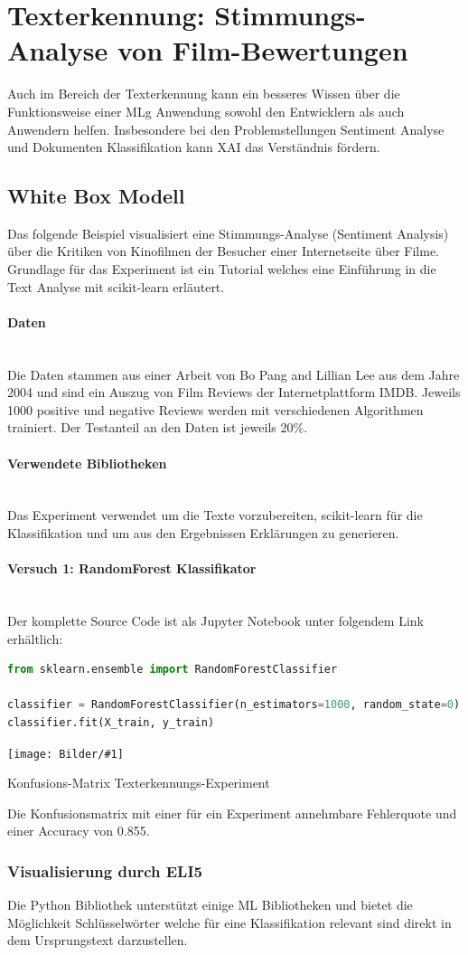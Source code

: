 \documentclass[
  12pt, %
  a4paper, %
  oneside, %
  openany, 
  numbers=noenddot, %
  BCOR=5mm, %
  parskip=half*, %
  thesis, %
]{bfhbook}
\newcommand{\parag}[1]{\paragraph*{#1}\mbox{}\\}
\newcommand{\imgText}[3]{
\begin{center}
    \begin{minipage}[t]{0.6\textwidth}
    		\vspace{0pt}
		\texttt{[image: Bilder/\#1]}
		\caption{#2}
	\end{minipage}\hfill
    \begin{minipage}[t]{0.4\textwidth}
    		\vspace{5pt}
  		#3
    \end{minipage}
\end{center}
}
\begin{document}
\section{Texterkennung: Stimmungs-Analyse von Film-Bewertungen}
Auch im Bereich der Texterkennung kann ein besseres Wissen über die Funktionsweise einer \Gls{MLg} Anwendung sowohl den Entwicklern als auch Anwendern helfen. Insbesondere bei den Problemstellungen Sentiment Analyse und Dokumenten Klassifikation kann \Gls{XAI} das Verständnis fördern.

\subsection{White Box Modell}
\label{eli5MovieReview}

Das folgende Beispiel visualisiert eine Stimmungs-Analyse (Sentiment Analysis) über die Kritiken von Kinofilmen der Besucher einer Internetseite über Filme. Grundlage für das Experiment ist ein Tutorial \cite{movieReview} welches eine Einführung in die Text Analyse mit scikit-learn erläutert. 

\parag{Daten}
Die Daten stammen aus einer Arbeit von Bo Pang and Lillian Lee \parencite{Pang+Lee2004} aus dem Jahre 2004 und sind ein Auszug von Film Reviews der Internetplattform IMDB. Jeweils 1000 positive und negative Reviews werden mit verschiedenen Algorithmen trainiert. Der Testanteil an den Daten ist jeweils 20\%.

\parag{Verwendete Bibliotheken}
Das Experiment verwendet \cite{nltk} um die Texte vorzubereiten, scikit-learn \cite{scikit-learnLink} für die Klassifikation und \cite{ELI5} um aus den Ergebnissen Erklärungen zu generieren. 

\parag{Versuch 1: RandomForest Klassifikator}
Der komplette Source Code ist als Jupyter Notebook unter folgendem Link erhältlich: \parencite{textClassEli5}
\begin{lstlisting}[language=Python]
from sklearn.ensemble import RandomForestClassifier

classifier = RandomForestClassifier(n_estimators=1000, random_state=0)
classifier.fit(X_train, y_train)
\end{lstlisting}

\imgText{MovieReviews-SentimentClassification_ConfMatrix.PNG}{Konfusions-Matrix Texterkennungs-Experiment}{
}
Die Konfusionsmatrix mit einer für ein Experiment annehmbare Fehlerquote und einer Accuracy von 0.855.

\subsubsection*{Visualisierung durch ELI5}
Die Python Bibliothek \cite{ELI5} unterstützt einige \gls{ML} Bibliotheken und bietet die Möglichkeit Schlüsselwörter welche für eine Klassifikation relevant sind direkt in dem Ursprungstext darzustellen. 
\end{document}
